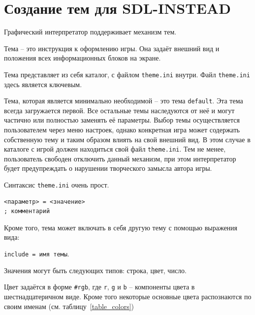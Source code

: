 \documentclass[12pt]{article}
\begin{document}
\section{Создание тем для SDL-INSTEAD}

Графический интерпретатор поддерживает механизм тем.

Тема -- это инструкция к оформлению игры. Она задаёт внешний вид и положения всех информационных блоков на экране.

Тема представляет из себя каталог, с файлом \verb/theme.ini/ внутри. Файл \verb/theme.ini/ здесь является ключевым.

Тема, которая является минимально необходимой -- это тема \verb/default/. Эта тема всегда загружается первой. Все остальные темы наследуются от неё и могут частично или полностью заменять её параметры. Выбор темы осуществляется пользователем через меню настроек, однако конкретная игра может содержать собственную тему и таким образом влиять на свой внешний вид. В этом случае в каталоге с игрой должен находиться свой файл \verb/theme.ini/. Тем не менее, пользователь свободен отключить данный механизм, при этом интерпретатор будет предупреждать о нарушении творческого замысла автора игры.

Синтаксис \verb/theme.ini/ очень прост.

\begin{verbatim}
<параметр> = <значение>
; комментарий
\end{verbatim}

Кроме того, тема может включать в себя другую тему с помощью выражения вида:

\verb/include = имя темы/.

Значения могут быть следующих типов: строка, цвет, число.

Цвет задаётся в форме \verb/#rgb/, где \verb/r/, \verb/g/ и \verb/b/ -- компоненты цвета в шестнадцатеричном виде. Кроме того некоторые основные цвета распознаются по своим именам (см. таблицу~\ref{table_colors})

\newcommand{\tabColor}[2]{
\textrm{#1} & \colorbox[HTML]{#2}{T.}
}

\newcommand{\tabColorq}[8]{
\tabColor{#1}{#2} & \tabColor{#3}{#4} & \tabColor{#5}{#6} & \tabColor{#7}{#8} \\
}

\newcommand{\tabColort}[6]{
\tabColor{#1}{#2} & \tabColor{#3}{#4} & \tabColor{#5}{#6} & & \\
}
\end{document}
